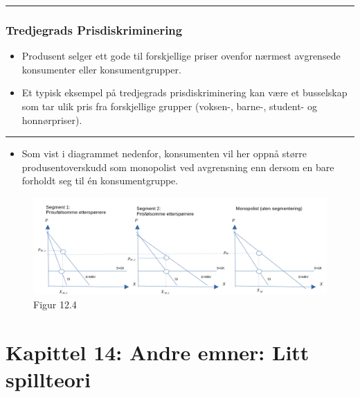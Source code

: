 \documentclass[
  letterpaper,
  DIV=11,
  numbers=noendperiod]{scrartcl}
\providecommand{\tightlist}{%
  \setlength{\itemsep}{0pt}\setlength{\parskip}{0pt}}\usepackage{longtable,booktabs,array}
\begin{document}
\begin{center}\rule{0.5\linewidth}{0.5pt}\end{center}

\subsubsection{Tredjegrads
Prisdiskriminering}\label{tredjegrads-prisdiskriminering}

\begin{itemize}
\tightlist
\item
  Produsent selger ett gode til forskjellige priser ovenfor nærmest
  avgrensede konsumenter eller konsumentgrupper.
\item
  Et typisk eksempel på tredjegrads prisdiskriminering kan være et
  busselskap som tar ulik pris fra forskjellige grupper (voksen-,
  barne-, student- og honnørpriser).
\end{itemize}

\begin{center}\rule{0.5\linewidth}{0.5pt}\end{center}

\begin{itemize}
\tightlist
\item
  Som vist i diagrammet nedenfor, konsumenten vil her oppnå større
  produsentoverskudd som monopolist ved avgrensning enn dersom en bare
  forholdt seg til én konsumentgruppe.
\end{itemize}

\begin{figure}[H]

{\centering \includegraphics[width=1\textwidth,height=\textheight]{drawio/3_gradskl.png}

}

\caption{Figur 12.4}

\end{figure}%

\section{Kapittel 14: Andre emner: Litt
spillteori}\label{kapittel-14-andre-emner-litt-spillteori}
\end{document}
